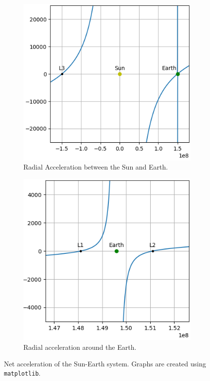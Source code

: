 \documentclass[12pt]{article}
\begin{document}
	\begin{figure}[h!]
		\centering
		\captionsetup[subfigure]{justification=centering}
		\begin{subfigure}[b]{0.4\textwidth}
			\centering
			\includegraphics[scale=0.6]{r-accel-figure-1.png}
			\caption{\footnotesize Radial Acceleration between the Sun and Earth.}
			\label{fig:radial-accel-system}
		\end{subfigure}
		\hspace*{1cm}
		\begin{subfigure}[b]{0.4\textwidth}
			\centering
			\includegraphics[scale=0.6]{r-accel-figure-2.png}
			\caption{\footnotesize Radial acceleration around the Earth.\vspace*{1.16em}}
			\label{fig:radial-accel-earth}
		\end{subfigure}
		\label{fig:radial-accel}
		\caption{Net acceleration of the Sun-Earth system. Graphs are created using \texttt{matplotlib}.}
	\end{figure} %
\end{document}
